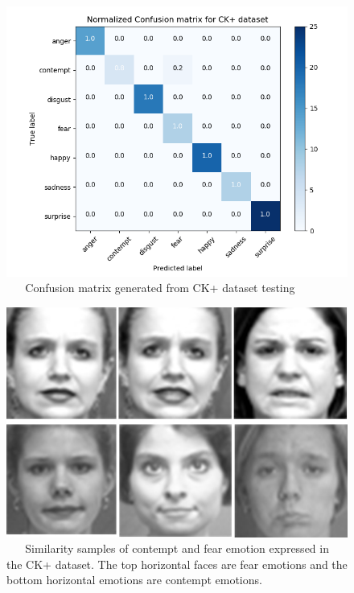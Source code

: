 \documentclass[master]{thesis-uestc}
\begin{document}
\begin{figure}[ht]
\includegraphics[width=5in]{pic/ck+_cm.png}
\caption{\,\,\,\,\,\,\,\,\,\,Confusion matrix generated from CK+ dataset testing}
\label{ck+_cm}
\end{figure}

\begin{figure}[ht]
\includegraphics[width=5in]{pic/ck+similarity.jpg}
\caption{\,\,\,\,\,\,\,\,\,\,Similarity samples of contempt and fear emotion expressed in the CK+ dataset. The top horizontal faces are fear emotions and the bottom horizontal emotions are contempt emotions.}
\label{ck+_similarity}
\end{figure}
\end{document}
